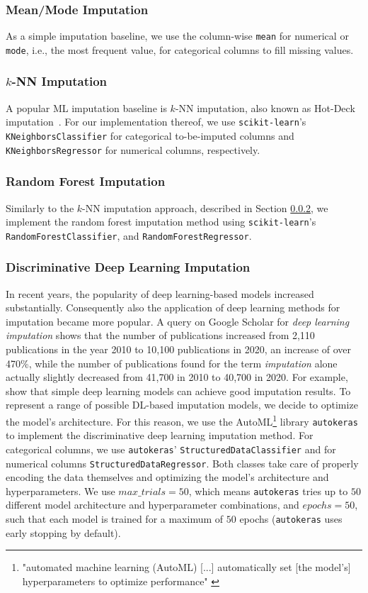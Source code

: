 \documentclass[utf8]{frontiersSCNS} %
\newcommand{\code}[1]{\texttt{#1}}
\begin{document}
\subsubsection{Mean/Mode Imputation}
\label{sec:simple_imputation}
%
As a simple imputation baseline, we use the column-wise \code{mean} for numerical or \code{mode}, i.e., the most frequent value,  for categorical columns to fill missing values.


\subsubsection{$k$-NN Imputation}
\label{sec:knKNN}
%
A popular ML imputation baseline is $k$-NN imputation, also known as Hot-Deck imputation~\citep{Batista2003}. For our implementation thereof, we use \code{scikit-learn}'s \code{KNeighborsClassifier} for categorical to-be-imputed columns and \code{KNeighborsRegressor} for numerical columns, respectively.


\subsubsection{Random Forest Imputation}
%
Similarly to the $k$-NN imputation approach, described in Section \ref{sec:knKNN}, we implement the random forest imputation method using \code{scikit-learn}'s \code{RandomForestClassifier}, and \code{RandomForestRegressor}.



\subsubsection{Discriminative Deep Learning Imputation}
\label{sec:dl_imputation}
%
In recent years, the popularity of deep learning-based models increased substantially. Consequently also the application of deep learning methods for imputation became more popular. A query on Google Scholar for {\em deep learning imputation} shows that the number of publications increased from 2,110 publications in the year 2010 to 10,100 publications in 2020, an increase of over 470\%, while the number of publications found for the term {\em imputation} alone actually slightly decreased from 41,700 in 2010 to 40,700 in 2020. For example, \cite{Biessmann2018a} show that simple deep learning models can achieve good imputation results. To represent a range of possible DL-based imputation models, we decide to optimize the model's architecture. For this reason, we use the AutoML\footnote{"automated machine learning (AutoML) [...] automatically set [the model's] hyperparameters to optimize performance" \cite{AutoML}} library \code{autokeras} \citep{AutoKeras} to implement the discriminative deep learning imputation method. For categorical columns, we use \code{autokeras}' \code{StructuredDataClassifier} and for numerical columns \code{StructuredDataRegressor}. Both classes take care of properly encoding the data themselves and optimizing the model's architecture and hyperparameters. We use $max\_trials = 50$, which means \code{autokeras} tries up to $50$ different model architecture and hyperparameter combinations, and $epochs = 50$, such that each model is trained for a maximum of $50$ epochs (\code{autokeras} uses early stopping by default).
\end{document}
